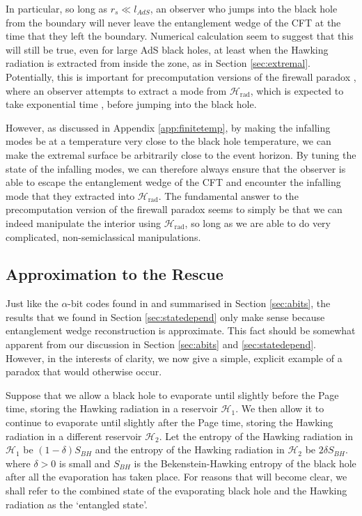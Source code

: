 \documentclass[11pt,a4paper]{article}
\begin{document}
In particular, so long as $r_s \ll l_{AdS}$, an observer who jumps into the black hole from the boundary will never leave the entanglement wedge of the CFT at the time that they left the boundary. Numerical calculation seem to suggest that this will still be true, even for large AdS black holes, at least when the Hawking radiation is extracted from inside the zone, as in Section \ref{sec:extremal}. Potentially, this is important for precomputation versions of the firewall paradox \cite{almheiri2013apologia}, where an observer attempts to extract a mode from $\mathcal{H}_\text{rad}$, which is expected to take exponential time \cite{harlow2013quantum}, before jumping into the black hole. 

However, as discussed in Appendix \ref{app:finitetemp}, by making the infalling modes be at a temperature very close to the black hole temperature, we can make the extremal surface be arbitrarily close to the event horizon. By tuning the state of the infalling modes, we can therefore always ensure that the observer is able to escape the entanglement wedge of the CFT and encounter the infalling mode that they extracted into $\mathcal{H}_\text{rad}$. The fundamental answer to the precomputation version of the firewall paradox seems to simply be that we can indeed manipulate the interior using $\mathcal{H}_\text{rad}$, so long as we are able to do very complicated, non-semiclassical manipulations.

\subsection{Approximation to the Rescue} \label{sec:approx}

Just like the $\alpha$-bit codes found in \cite{hayden2018learning} and summarised in Section \ref{sec:abits}, the results that we found in Section \ref{sec:statedepend} only make sense because entanglement wedge reconstruction is approximate. This fact should be somewhat apparent from our discussion in Section \ref{sec:abits} and \ref{sec:statedepend}. However, in the interests of clarity, we now give a simple, explicit example of a paradox that would otherwise occur.

Suppose that we allow a black hole to evaporate until slightly before the Page time, storing the Hawking radiation in a reservoir $\mathcal{H}_{1}$. We then allow it to continue to evaporate until slightly after the Page time, storing the Hawking radiation in a different reservoir $\mathcal{H}_{2}$. Let the entropy of the Hawking radiation in $\mathcal{H}_{1}$ be $(1-\delta)S_{BH}$ and the entropy of the Hawking radiation in $\mathcal{H}_{2}$ be $2 \delta S_{BH}$. where $\delta>0$ is small and $S_{BH}$ is the Bekenstein-Hawking entropy of the black hole after all the evaporation has taken place. For reasons that will become clear, we shall refer to the combined state of the evaporating black hole and the Hawking radiation as the `entangled state'.
\end{document}
